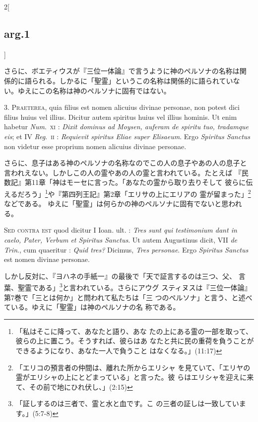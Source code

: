 \documentclass[paper=a4paper,fontsize=10pt,jafontsize=9pt,titlepage]{jlreq}
\begin{document}
\begin{paracol}{2}[\subsection{arg.1}]
\switchcolumn

さらに、ボエティウスが『三位一体論』で言うように神のペルソナの名称は関
 係的に語られる。しかるに「聖霊」というこの名称は関係的に語られていな
 い。ゆえにこの名称は神のペルソナに固有ではない。


3. {\scshape Praeterea}, quia filius est nomen alicuius divinae personae, non potest
dici filius huius vel illius. Dicitur autem spiritus huius vel illius
hominis. Ut enim habetur {\itshape Num}.~{\scshape xi} : {\itshape Dixit dominus ad Moysen, auferam de
spiritu tuo, tradamque eis}; et IV {\itshape Reg}.~{\scshape ii} : {\itshape Requievit spiritus Eliae
super Elisaeum}. Ergo {\itshape Spiritus Sanctus} non videtur esse proprium nomen
alicuius divinae personae.

\switchcolumn

さらに、息子はある神のペルソナの名称なのでこの人の息子やあの人の息子と
 言われえない。しかしこの人の霊やあの人の霊と言われている。たとえば
 『民数記』第11章「神はモーセに言った。「あなたの霊から取り去りそして
 彼らに伝えるだろう」\footnote{「私はそこに降って、あなたと語り、あな
 たの上にある霊の一部を取って、彼らの上に置こう。そうすれば、彼らはあ
 なたと共に民の重荷を負うことができるようになり、あなた一人で負うこと
 はなくなる。」(11:17)}や『第四列王記』第2章「エリサの上にエリアの
 霊が留まった」\footnote{「エリコの預言者の仲間は、離れた所からエリシャ
 を見ていて、「エリヤの霊がエリシャの上にとどまっている」と言った。彼
 らはエリシャを迎えに来て、その前で地にひれ伏し、」(2:15) }などである。
 ゆえに「聖霊」は何らかの神のペルソナに固有でないと思われる。

\switchcolumn*[\subsection{s.c.}]

{\scshape Sed contra est} quod dicitur I Ioan. ult. : {\itshape Tres sunt qui testimonium
dant in caelo, Pater, Verbum et Spiritus Sanctus}. Ut autem Augustinus
dicit, VII {\itshape de Trin}., cum quaeritur : {\itshape Quid tres?} Dicimus, {\itshape Tres
personae}. Ergo {\itshape Spiritus Sanctus} est nomen divinae personae.

\switchcolumn

しかし反対に、『ヨハネの手紙一』の最後で「天で証言するのは三つ、父、
 言葉、聖霊である」\footnote{「証しするのは三者で、霊と水と血です。こ
 の三者の証しは一致しています。」(5:7-8)}と言われている。さらにアウグ
 スティヌスは『三位一体論』第7巻で「三とは何か」と問われて私たちは「三
 つのペルソナ」と言う、と述べている。ゆえに「聖霊」は神のペルソナの名
 称である。


\end{paracol}
\end{document}
